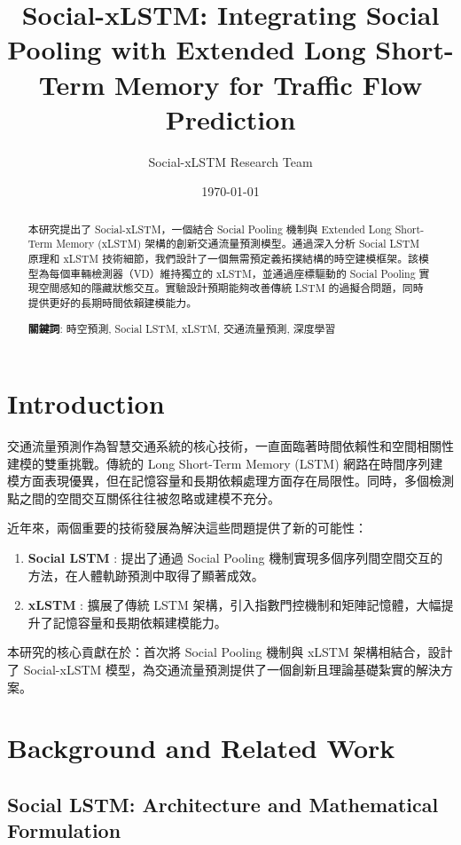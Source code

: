 \documentclass[11pt,a4paper]{article}
\title{Social-xLSTM: Integrating Social Pooling with Extended Long Short-Term Memory for Traffic Flow Prediction}
\author{Social-xLSTM Research Team}
\date{\today}
\begin{document}
\maketitle

\begin{abstract}
本研究提出了 Social-xLSTM，一個結合 Social Pooling 機制與 Extended Long Short-Term Memory (xLSTM) 架構的創新交通流量預測模型。通過深入分析 Social LSTM 原理和 xLSTM 技術細節，我們設計了一個無需預定義拓撲結構的時空建模框架。該模型為每個車輛檢測器（VD）維持獨立的 xLSTM，並通過座標驅動的 Social Pooling 實現空間感知的隱藏狀態交互。實驗設計預期能夠改善傳統 LSTM 的過擬合問題，同時提供更好的長期時間依賴建模能力。

\textbf{關鍵詞}: 時空預測, Social LSTM, xLSTM, 交通流量預測, 深度學習
\end{abstract}

\section{Introduction}

交通流量預測作為智慧交通系統的核心技術，一直面臨著時間依賴性和空間相關性建模的雙重挑戰。傳統的 Long Short-Term Memory (LSTM) 網路在時間序列建模方面表現優異，但在記憶容量和長期依賴處理方面存在局限性。同時，多個檢測點之間的空間交互關係往往被忽略或建模不充分。

近年來，兩個重要的技術發展為解決這些問題提供了新的可能性：

\begin{enumerate}
\item \textbf{Social LSTM} \cite{alahi2016social}: 提出了通過 Social Pooling 機制實現多個序列間空間交互的方法，在人體軌跡預測中取得了顯著成效。

\item \textbf{xLSTM} \cite{beck2024xlstm}: 擴展了傳統 LSTM 架構，引入指數門控機制和矩陣記憶體，大幅提升了記憶容量和長期依賴建模能力。
\end{enumerate}

本研究的核心貢獻在於：首次將 Social Pooling 機制與 xLSTM 架構相結合，設計了 Social-xLSTM 模型，為交通流量預測提供了一個創新且理論基礎紮實的解決方案。

\section{Background and Related Work}

\subsection{Social LSTM: Architecture and Mathematical Formulation}
\end{document}

